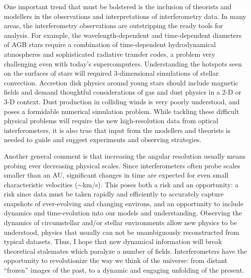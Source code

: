 \documentclass[12pt]{iopart}
\begin{document}
One important trend that must be bolstered is the inclusion of
theorists and modellers in the observations and interpretations of
interferometry data.  In many areas, the interferometry observations
are outstripping the ready tools for analysis.  For example, the
wavelength-dependent and time-dependent diameters of AGB stars require
a combination of time-dependent hydrodynamical atmospheres and
sophisticated radiative transfer codes, a problem very challenging
even with today's supercomputers.  Understanding the hotspots seen on
the surfaces of stars will required 3-dimensional simulations of
stellar convection.  Accretion disk physics around young stars should
include magnetic fields and demand thoughtful considerations of gas and dust
physics in a 2-D or 3-D context.  Dust production in colliding winds
is very poorly understood, and poses a formidable numerical simulation
problem.  While tackling these difficult physical problems will
require the new high-resolution data from optical interferometers, it
is also true that input from the modellers and theorists is needed to
guide and suggest experiments and observing strategies.

Another general comment is that increasing the angular resolution
usually means probing ever decreasing physical scales.  Since
interferometers often probe scales smaller than an AU, significant
changes in time are expected for even small characteristic velocities
($\sim$km/s).  This poses both a risk and an opportunity: a risk since
data must be taken rapidly and efficiently to accurately capture
snapshots of ever-evolving and changing environs, and an opportunity
to include dynamics and time-evolution into our models and
understanding.  Observing the dynamics of circumstellar and/or stellar
environments allow new physics to be understood, physics that usually
can not be unambiguously reconstructed from typical datasets. Thus, I
hope that new dynamical information will break theoretical stalemates
which paralyze a number of fields.  Interferometers have the
opportunity to revolutionize the way we think of the universe: from
distant ``frozen'' images of the past, to a dynamic and engaging
unfolding of the present.
\end{document}
